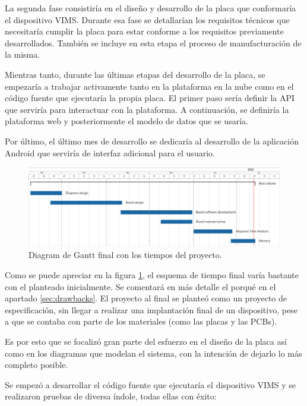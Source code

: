 La segunda fase consistiría en el diseño y desarrollo de la placa que conformaría
el dispositivo \ac{VIMS}. Durante esa fase se detallarían los requisitos técnicos
que necesitaría cumplir la placa para estar conforme a los requisitos previamente
desarrollados. También se incluye en esta etapa el proceso de manufacturación
de la misma.

Mientras tanto, durante las últimas etapas del desarrollo de la placa, se empezaría
a trabajar activamente tanto en la plataforma en la nube como en el código fuente que
ejecutaría la propia placa. El primer paso sería definir la \ac{API} que serviría para
interactuar con la plataforma. A continuación, se definiría la plataforma web y posteriormente
el modelo de datos que se usaría.

Por último, el último mes de desarrollo se dedicaría al desarrollo de la aplicación
Android que serviría de interfaz adicional para el usuario.

\begin{figure}[H]
  \centering
  \includegraphics[width=\linewidth]{images/gantt-chart-real.png}
  \caption{Diagram de Gantt final con los tiempos del proyecto.}
  \label{fig:gantt-real}
\end{figure}

Como se puede apreciar en la figura \ref{fig:gantt-real}, el esquema de tiempo final
varía bastante con el planteado inicialmente. Se comentará en más detalle el porqué
en el apartado \ref{sec:drawbacks}. El proyecto al final se planteó como un proyecto
de especificación, sin llegar a realizar una implantación final de un dispositivo,
pese a que se contaba con parte de los materiales (como las placas y las PCBs).

Es por esto que se focalizó gran parte del esfuerzo en el diseño de la placa así como
en los diagramas que modelan el sistema, con la intención de dejarlo lo más
completo posible.

Se empezó a desarrollar el código fuente que ejecutaría el dispositivo \ac{VIMS}
y se realizaron pruebas de diversa índole, todas ellas con éxito:

